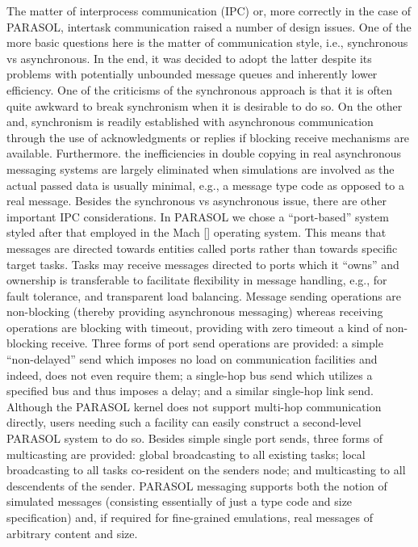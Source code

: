 \documentclass[11pt]{article}
\begin{document}
The matter of interprocess communication (IPC) or, more correctly in the case of PARASOL, 
intertask communication raised a number of design issues. One of the more basic questions here is the 
matter of communication style, i.e., synchronous vs asynchronous. In the end, it was decided to
adopt the latter despite its problems with potentially unbounded message queues and inherently
lower efficiency. One of the criticisms of the synchronous approach is that it is often quite
awkward to break synchronism when it is desirable to do so. On the other and, synchronism is
readily established with asynchronous communication through the use of acknowledgments or
replies if blocking receive mechanisms are available. Furthermore. the inefficiencies in double
copying in real asynchronous messaging systems are largely eliminated when simulations are
involved as the actual passed data is usually minimal, e.g., a message type code as opposed to a
real message. Besides the synchronous vs asynchronous issue, there are other important IPC
considerations. In PARASOL we chose a ``port-based'' system styled after that employed in the
Mach [] operating system. This means that messages are directed towards entities called ports
rather than towards specific target tasks. Tasks may receive messages directed to ports which it
``owns'' and ownership is transferable to facilitate flexibility in message handling, e.g., for fault
tolerance, and transparent load balancing. Message sending operations are non-blocking (thereby
providing asynchronous messaging) whereas receiving operations are blocking with timeout,
providing with zero timeout a kind of non-blocking receive. Three forms of port send operations
are provided: a simple ``non-delayed'' send which imposes no load on communication facilities and
indeed, does not even require them; a single-hop bus send which utilizes a specified bus and thus
imposes a delay; and a similar single-hop link send. Although the PARASOL kernel does not
support multi-hop communication directly, users needing such a facility can easily construct a
second-level PARASOL system to do so. Besides simple single port sends, three forms of
multicasting are provided: global broadcasting to all existing tasks; local broadcasting to all tasks
co-resident on the senders node; and multicasting to all descendents of the sender. PARASOL
messaging supports both the notion of simulated messages (consisting essentially of just a type
code and size specification) and, if required for fine-grained emulations, real messages of arbitrary
content and size.
\end{document}
